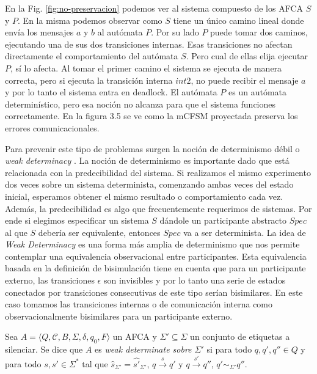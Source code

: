  En la Fig. \ref{fig:no-preservacion} podemos ver al sistema compuesto de los AFCA $S$ y $P$. En la misma podemos observar como $S$ tiene un único camino lineal donde envía los mensajes $a$ y $b$ al autómata $P$. Por su lado $P$ puede tomar dos caminos, ejecutando una de sus dos transiciones internas. Esas transiciones no afectan directamente el comportamiento del autómata $S$. Pero cual de ellas elija ejecutar $P$, sí lo afecta. Al tomar el primer camino el sistema se ejecuta de manera correcta, pero si ejecuta la transición interna $int2$, no puede recibir el mensaje $a$ y por lo tanto el sistema entra en deadlock. El autómata $P$ es un autómata determinístico, pero esa noción no alcanza para que el sistema funciones correctamente. En la figura 3.5 se ve como la mCFSM proyectada preserva los errores comunicacionales.  

Para prevenir este tipo de problemas surgen la noción de determinismo débil o \emph{weak determinacy} \cite[Chap.~11, Def.~3]{milner89}. La noción de determinismo es importante dado que está relacionada con la predecibilidad del sistema. Si realizamos el mismo experimento dos veces sobre un sistema determinista, comenzando ambas veces del estado inicial, esperamos obtener el mismo resultado o comportamiento cada vez. Además, la predecibilidad es algo que frecuentemente requerimos de sistemas. Por ende si elegimos especificar un sistema $S$ dándole un participante abstracto $Spec$ al que $S$ debería ser equivalente, entonces $Spec$ va a ser determinista. La idea de \emph{Weak Determinacy} es una forma más amplia de determinismo que nos permite contemplar una equivalencia observacional entre participantes. Esta equivalencia basada en la definición de bisimulación tiene en cuenta que para un participante externo, las transiciones $\epsilon$ son invisibles y por lo tanto una serie de estados conectados por transiciones consecutivas de este tipo serían bisimilares. En este caso tomamos las transiciones internas o de comunicación interna como observacionalmente bisimilares para un participante externo.  


\begin{definition}
Sea $A= \langle Q, \mathcal{C}, B, \Sigma, \delta, q_0, F \rangle$ un AFCA y $\Sigma' \subseteq \Sigma$ un conjunto de etiquetas a silenciar. Se dice que $A$ es \emph{weak determinate sobre $\Sigma'$} si para todo $q, q', q'' \in Q$ y para todo $s, s' \in \Sigma^*$ tal que $\widehat{s}_{\Sigma'} = \widehat{s'}_{\Sigma'}$, $q \xrightarrow{s} q'$ y $q \xrightarrow{s'} q''$, $q' \sim_{\Sigma'} q''$.
\end{definition}

